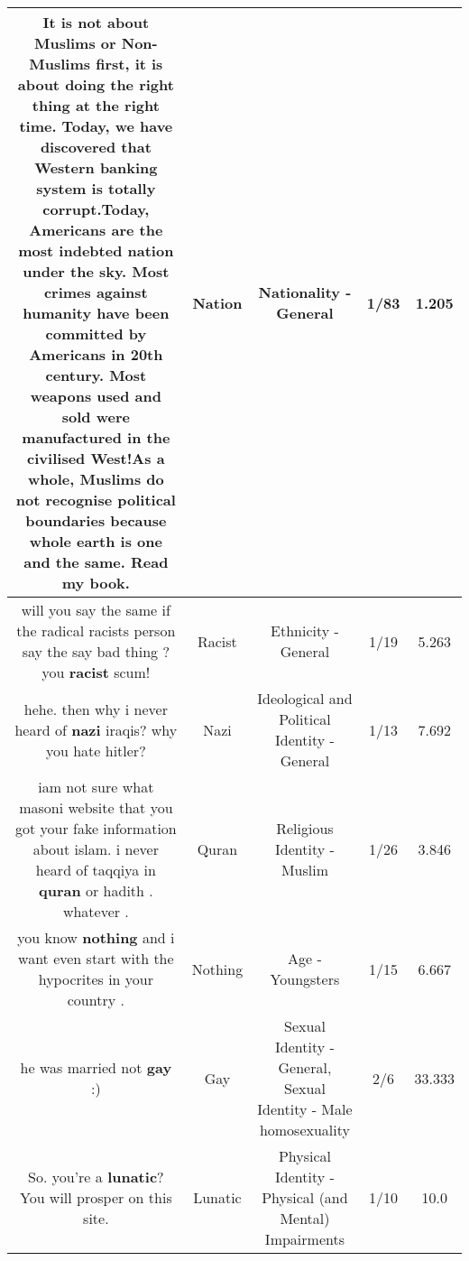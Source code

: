 \documentclass[11pt]{article}
\newlength\mylength
\begin{document}
\begin{center}
\begin{longtable}{|C{.65\mylength}|C{.30\mylength}|C{.12\mylength}|C{.12\mylength}|C{.12\mylength}|}
  \small It is not about Muslims or Non-Muslims first, it is about doing the right thing at the right time.  Today, we have discovered that Western banking system is totally corrupt.Today, Americans are the most indebted \textbf{nation} under the sky.  Most crimes against humanity have been committed by Americans in 20th century.  Most weapons used and sold were manufactured in the civilised West!As a whole, Muslims do not recognise political boundaries because whole earth is one and the same.  Read my book.\normalsize   & Nation & Nationality - General & 1/83 & 1.205 \\  \hline
  \small will you say the same if the radical racists person say the say bad thing ? you \textbf{racist} scum!\normalsize   & Racist & Ethnicity - General & 1/19 & 5.263 \\  \hline
  \small hehe. then why i never heard of \textbf{nazi}  iraqis? why you hate hitler?\normalsize   & Nazi &  Ideological and Political Identity - General & 1/13 & 7.692 \\  \hline
  \small iam not sure what masoni website that you got your fake information about islam. i never heard of taqqiya in \textbf{quran} or hadith . whatever .\normalsize   & Quran & Religious Identity - Muslim & 1/26 & 3.846 \\  \hline
  \small you know \textbf{nothing} and i want even start with the hypocrites in your country .\normalsize   & Nothing & Age - Youngsters & 1/15 & 6.667 \\  \hline
  \small he was married not \textbf{g\textbf{ay}} :)\normalsize   & Gay & Sexual Identity - General, Sexual Identity - Male homosexuality & 2/6 & 33.333 \\  \hline
  \small So. you're a \textbf{lunatic}? You will prosper on this site.\normalsize   & Lunatic & Physical Identity - Physical (and Mental) Impairments & 1/10 & 10.0 \\  \hline

\end{longtable}
\end{center}
\end{document}
